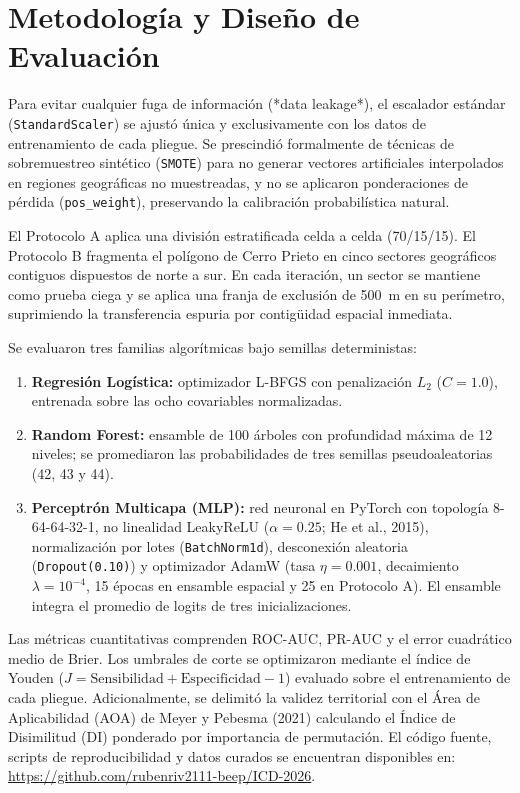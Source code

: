 \documentclass[10pt,twocolumn,a4paper]{article}
\begin{document}
\section{Metodología y Diseño de Evaluación}
Para evitar cualquier fuga de información (*data leakage*), el escalador estándar (\texttt{StandardScaler}) se ajustó única y exclusivamente con los datos de entrenamiento de cada pliegue. Se prescindió formalmente de técnicas de sobremuestreo sintético (\texttt{SMOTE}) para no generar vectores artificiales interpolados en regiones geográficas no muestreadas, y no se aplicaron ponderaciones de pérdida (\texttt{pos\_weight}), preservando la calibración probabilística natural.

El Protocolo A aplica una división estratificada celda a celda (70/15/15). El Protocolo B fragmenta el polígono de Cerro Prieto en cinco sectores geográficos contiguos dispuestos de norte a sur. En cada iteración, un sector se mantiene como prueba ciega y se aplica una franja de exclusión de 500~m en su perímetro, suprimiendo la transferencia espuria por contigüidad espacial inmediata.

Se evaluaron tres familias algorítmicas bajo semillas deterministas:
\begin{enumerate}
\itemsep0pt  
\item \textbf{Regresión Logística:} optimizador L-BFGS con penalización $L_2$ ($C = 1.0$), entrenada sobre las ocho covariables normalizadas.
\item \textbf{Random Forest:} ensamble de 100 árboles con profundidad máxima de 12 niveles; se promediaron las probabilidades de tres semillas pseudoaleatorias (42, 43 y 44).
\item \textbf{Perceptrón Multicapa (MLP):} red neuronal en PyTorch con topología 8-64-64-32-1, no linealidad LeakyReLU ($\alpha = 0.25$; He et al., 2015), normalización por lotes (\texttt{BatchNorm1d}), desconexión aleatoria (\texttt{Dropout(0.10)}) y optimizador AdamW (tasa $\eta = 0.001$, decaimiento $\lambda = 10^{-4}$, 15 épocas en ensamble espacial y 25 en Protocolo A). El ensamble integra el promedio de logits de tres inicializaciones.
\end{enumerate}

Las métricas cuantitativas comprenden ROC-AUC, PR-AUC y el error cuadrático medio de Brier. Los umbrales de corte se optimizaron mediante el índice de Youden ($J = \text{Sensibilidad} + \text{Especificidad} - 1$) evaluado sobre el entrenamiento de cada pliegue. Adicionalmente, se delimitó la validez territorial con el Área de Aplicabilidad (AOA) de Meyer y Pebesma (2021) calculando el Índice de Disimilitud (DI) ponderado por importancia de permutación. El código fuente, scripts de reproducibilidad y datos curados se encuentran disponibles en: \url{https://github.com/rubenriv2111-beep/ICD-2026}.
\end{document}
